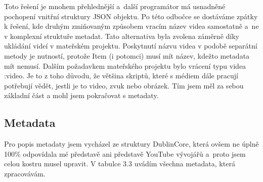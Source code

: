 \par Toto řešení je mnohem přehlednější a~další programátor má usnadněné pochopení vnitřní struktury JSON objektu. Po této odbočce se dostáváme zpátky k řešení, kde druhým zmiňovaným způsobem vracím název videa samostatně a~ne v komplexní struktuře metadat. Tato alternativa byla zvolena záměrně díky ukládání videí v mateřském projektu. Poskytnutí názvu videa v podobě separátní metody je nutností, protože Item (i potomci) musí mít název, kdežto metadata mít nemusí. Dalším požadavkem mateřského projektu bylo vrácení typu videa :video. Je to z toho důvodu, že většina skriptů, které s médiem dále pracují potřebují vědět, jestli je to video, zvuk nebo obrázek. Tím jsem měl za sebou základní část a mohl jsem pokračovat s metadaty.

\subsection{Metadata}

\par Pro popis metadaty jsem vycházel ze struktury DublinCore, která ovšem ne úplně 100\% odpovídala mé představě ani představě YouTube vývojářů a~proto jsem celou kostru musel upravit. V tabulce 3.3 uvádím všechna metadata, která zpracovávám.

